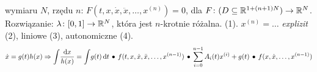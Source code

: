   wymiaru $N$, rzędu $n$: $F(t, x, \dot{x}, \ddot{x}, \dots, x^{(n)}) = 0$, dla $F \colon (D \subseteq \mathbb{R}^{1+(n+1)N}) \to \mathbb{R}^N$.
Rozwiązanie: $\lambda \colon [0,1] \to \mathbb{R}^N$, która jest $n$-krotnie różalna.
 (1).
 $x^{(n)} = \dots$ \emph{explizit} (2), liniowe (3), autonomiczne (4).
\[
	\dot x = g(t) h(x) \Rightarrow \int\! \frac{\textrm{d} x}{h(x)} = \int\! g(t)\,\textrm{d} t \, \bullet \,
	f(t, x, \dot{x}, \ddot{x}, \dots, x^{(n-1)})\, \bullet \,
	\sum_{i=0}^{n-1}A_i(t) x^{(i)} + g(t) \, \bullet \,
	f(x, \dot{x}, \dots, x^{(n-1)})
\]
